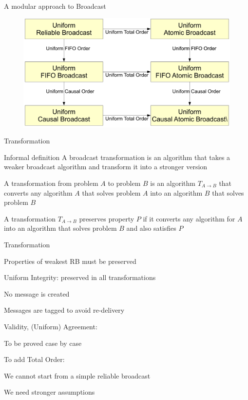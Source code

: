 \begin{frame}{A modular approach to Broadcast}

\begin{figure}
	\includegraphics[width=\textwidth]{figs/04/rb-modular-urb1}
\end{figure}

\end{frame}



\begin{frame}{Transformation}
	
\begin{block}{Informal definition}
A broadcast transformation is an algorithm that takes a weaker broadcast 
algorithm and transform it into a stronger version
\end{block}

\begin{definition}[Transformation]
A \alert{transformation} from problem $A$ to problem $B$ is an algorithm $T_{A \rightarrow B}$ that converts 
any algorithm $A$ that solves problem $A$ into an algorithm $B$ that
solves problem $B$
\end{definition}

\begin{definition}[Preservation]
A transformation $T_{A \rightarrow B}$ \alert{preserves} property $P$ if it
converts any algorithm for $A$ into an algorithm that solves problem $B$ and
also satisfies $P$
\end{definition}
	
\end{frame}

\begin{frame}{Transformation}
\BIL
\item Properties of weakest RB must be preserved
  \BI
  \item \alert{Uniform Integrity}: preserved in all transformations
  \BI
    \item No message is created
    \item Messages are tagged to avoid re-delivery
  \EI
  \item \alert{Validity}, \alert{(Uniform) Agreement}: 
  \BI
    \item To be proved case by case
  \EI
  \EI
\item  To add Total Order:
  \BI
  \item We cannot start from a simple reliable broadcast
  \item We need stronger assumptions
  \EI
\EIL
\end{frame}

